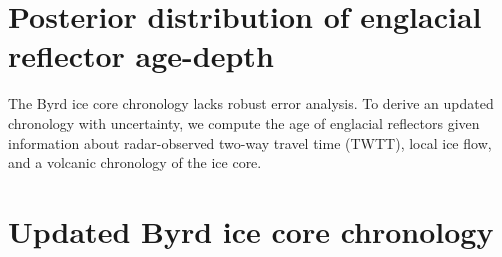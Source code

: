 \documentclass[draft,jgrga]{AGUTeX}
\begin{document}
\section{Posterior distribution of englacial reflector age-depth}\label{byrdchronology}
The Byrd ice core chronology lacks robust error analysis. To derive an updated chronology with uncertainty, we compute the age of englacial reflectors given information about radar-observed two-way travel time (TWTT), local ice flow, and a volcanic chronology of the ice core.

	
	
\section{Updated Byrd ice core chronology}\label{agedepthresults}


%



\end{document}
